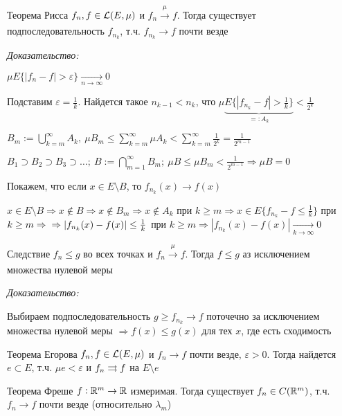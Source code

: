 \documentclass[12pt]{article}
\begin{document}
\begin{theo}{Теорема Рисса}
    $f_n, f \in \mathcal{L}(E, \mu)$ и $f_n \xrightarrow[]{\mu} f$. Тогда существует подпоследовательность $f_{n_k}$, т.ч. $f_{n_k} \to f$ почти везде
\end{theo}

\textit{Доказательство:}

$\mu E\{|f_n - f| > \varepsilon\} \xrightarrow[n \to \infty]{} 0$

Подставим $\varepsilon = \frac{1}{k}$. Найдется такое $n_{k - 1} < n_k$, что $\mu \underbrace{E\{|f_{n_k} - f| > \frac{1}{k}\}}_{=: A_k} < \frac{1}{2^k}$

$B_m := \bigcup\limits_{k = m}^\infty A_k,\ \mu B_m \leq \sum\limits_{k = m}^\infty \mu A_k < \sum\limits_{k = m}^\infty \frac{1}{2^k} = \frac{1}{2^{m - 1}}$

$B_1 \supset B_2 \supset B_3 \supset \ldots;\ B := \bigcap\limits_{m = 1}^\infty B_m;\ \mu B \leq \mu B_m < \frac{1}{2^{m - 1}} \Rightarrow \mu B = 0$

Покажем, что если $x \in E \setminus B$, то $f_{n_k}(x) \to f(x)$

$x \in E \setminus B \Rightarrow x \notin B \Rightarrow x \notin B_m \Rightarrow x \notin A_k$ при $k \geq m \Rightarrow x \in E\{f_{n_k} - f \leq \frac{1}{k}\}$ при $k \geq m \Rightarrow \\ \Rightarrow |f_{n_k}(x) - f(x)| \leq \frac{1}{k}$ при $k \geq m \Rightarrow |f_{n_k}(x) - f(x)| \xrightarrow[k \to \infty]{} 0$

\begin{theo}{Следствие}
    $f_n \leq g$ во всех точках и $f_n \xrightarrow[]{\mu} f$. Тогда $f \leq g$ аз исключением множества нулевой меры 
\end{theo}

\textit{Доказательство:}

Выбираем подпоследовательность $g \geq f_{n_k} \to f$ поточечно за исключением множества нулевой меры $\Rightarrow f(x) \leq g(x)$ для тех $x$, где есть сходимость 

\begin{theo}{Теорема Егорова}
    $f_n, f \in \mathcal{L}(E, \mu)$ и $f_n \to f$ почти везде, $\varepsilon > 0$. Тогда найдется $e \subset E$, т.ч. $\mu e < \varepsilon$ и $f_n \rightrightarrows f$ на $E \setminus e$
\end{theo}

\begin{theo}{Теорема Фреше}
    $f : \mathbb R^m \to \mathbb R$ измеримая. Тогда существует $f_n \in C(\mathbb R^m)$, т.ч. $f_n \to f$ почти везде (относительно $\lambda_m$)
\end{theo}
\end{document}
